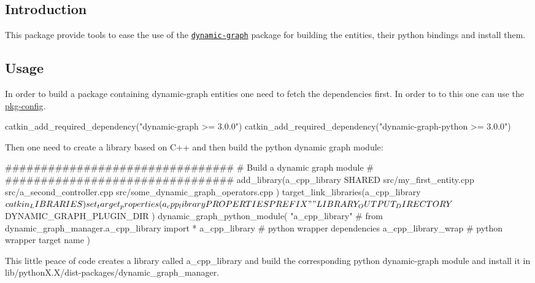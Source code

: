 \subsection*{Introduction}

This package provide tools to ease the use of the \href{https://github.com/stack-of-tasks/dynamic-graph}{\tt dynamic-\/graph} package for building the entities, their python bindings and install them.

\subsection*{Usage}

In order to build a package containing dynamic-\/graph entities one need to fetch the dependencies first. In order to to this one can use the \hyperlink{md_doc_pkg_config}{pkg-\/config}. \begin{DoxyVerb}catkin_add_required_dependency("dynamic-graph >= 3.0.0")
catkin_add_required_dependency("dynamic-graph-python >= 3.0.0")
\end{DoxyVerb}


Then one need to create a library based on C++ and then build the python dynamic graph module\+: \begin{DoxyVerb}################################
# Build a dynamic graph module #
################################
add_library(a_cpp_library SHARED
    src/my_first_entity.cpp
    src/a_second_controller.cpp
    src/some_dynamic_graph_operators.cpp
)
target_link_libraries(a_cpp_library ${catkin_LIBRARIES})
set_target_properties(a_cpp_library PROPERTIES
    PREFIX ""
    LIBRARY_OUTPUT_DIRECTORY ${DYNAMIC_GRAPH_PLUGIN_DIR}
)
dynamic_graph_python_module(
    "a_cpp_library"    # from dynamic_graph_manager.a_cpp_library import *
    a_cpp_library      # python wrapper dependencies
    a_cpp_library_wrap # python wrapper target name
)
\end{DoxyVerb}


This little peace of code creates a library called {\ttfamily a\+\_\+cpp\+\_\+library} and build the corresponding python dynamic-\/graph module and install it in {\ttfamily lib/python\+X.\+X/dist-\/packages/dynamic\+\_\+graph\+\_\+manager}. 